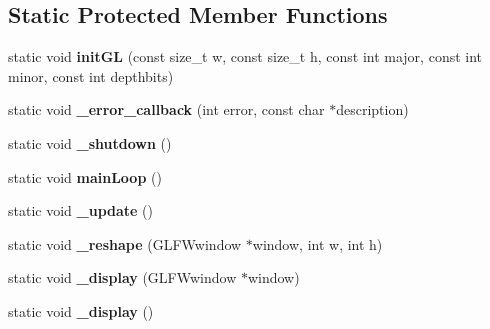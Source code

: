 \subsection*{Static Protected Member Functions}
\begin{DoxyCompactItemize}
\item 
\hypertarget{classs9_1_1gl_1_1GLFWApp_a66c45346df5e95068043478056a47b4d}{static void {\bfseries init\-G\-L} (const size\-\_\-t w, const size\-\_\-t h, const int major, const int minor, const int depthbits)}\label{classs9_1_1gl_1_1GLFWApp_a66c45346df5e95068043478056a47b4d}

\item 
\hypertarget{classs9_1_1gl_1_1GLFWApp_a1c57eeeda2370c71d767439650e7b066}{static void {\bfseries \-\_\-error\-\_\-callback} (int error, const char $\ast$description)}\label{classs9_1_1gl_1_1GLFWApp_a1c57eeeda2370c71d767439650e7b066}

\item 
\hypertarget{classs9_1_1gl_1_1GLFWApp_ae04abf149f8f13e9872fd3de6e39ca06}{static void {\bfseries \-\_\-shutdown} ()}\label{classs9_1_1gl_1_1GLFWApp_ae04abf149f8f13e9872fd3de6e39ca06}

\item 
\hypertarget{classs9_1_1gl_1_1GLFWApp_a267576d5ae88b0fa2d8393b1ffa358f4}{static void {\bfseries main\-Loop} ()}\label{classs9_1_1gl_1_1GLFWApp_a267576d5ae88b0fa2d8393b1ffa358f4}

\item 
\hypertarget{classs9_1_1gl_1_1GLFWApp_ae845753b4761741ca259aa7135b0b8ef}{static void {\bfseries \-\_\-update} ()}\label{classs9_1_1gl_1_1GLFWApp_ae845753b4761741ca259aa7135b0b8ef}

\item 
\hypertarget{classs9_1_1gl_1_1GLFWApp_a3cd3b3db888c3b5f4758b3cf19101382}{static void {\bfseries \-\_\-reshape} (G\-L\-F\-Wwindow $\ast$window, int w, int h)}\label{classs9_1_1gl_1_1GLFWApp_a3cd3b3db888c3b5f4758b3cf19101382}

\item 
\hypertarget{classs9_1_1gl_1_1GLFWApp_a26677932d0d6e7d70c13074e80ccf0fa}{static void {\bfseries \-\_\-display} (G\-L\-F\-Wwindow $\ast$window)}\label{classs9_1_1gl_1_1GLFWApp_a26677932d0d6e7d70c13074e80ccf0fa}

\item 
\hypertarget{classs9_1_1gl_1_1GLFWApp_a50f938d530b1a8a10e024c8b96d26144}{static void {\bfseries \-\_\-display} ()}\label{classs9_1_1gl_1_1GLFWApp_a50f938d530b1a8a10e024c8b96d26144}


\end{DoxyCompactItemize}
